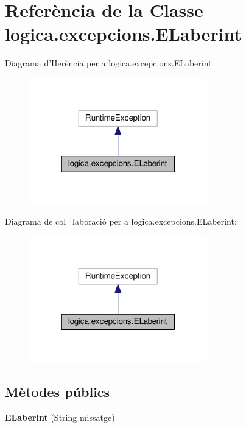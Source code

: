 \hypertarget{classlogica_1_1excepcions_1_1_e_laberint}{\section{Referència de la Classe logica.\+excepcions.\+E\+Laberint}
\label{classlogica_1_1excepcions_1_1_e_laberint}
}


Diagrama d'Herència per a logica.\+excepcions.\+E\+Laberint\+:\nopagebreak
\begin{figure}[H]
\begin{center}
\leavevmode
\includegraphics[width=219pt]{classlogica_1_1excepcions_1_1_e_laberint__inherit__graph}
\end{center}
\end{figure}


Diagrama de col·laboració per a logica.\+excepcions.\+E\+Laberint\+:\nopagebreak
\begin{figure}[H]
\begin{center}
\leavevmode
\includegraphics[width=219pt]{classlogica_1_1excepcions_1_1_e_laberint__coll__graph}
\end{center}
\end{figure}
\subsection*{Mètodes públics}
\begin{DoxyCompactItemize}
\item 
\hypertarget{classlogica_1_1excepcions_1_1_e_laberint_a351544cabefcda88ba9b90f035542f91}{{\bfseries E\+Laberint} (String missatge)}\label{classlogica_1_1excepcions_1_1_e_laberint_a351544cabefcda88ba9b90f035542f91}

\end{DoxyCompactItemize}


